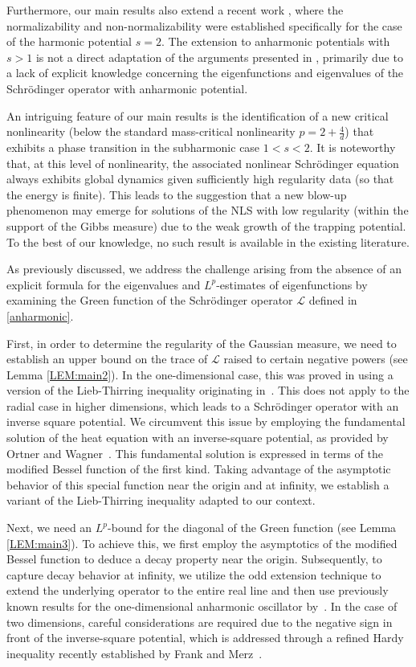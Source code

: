 \documentclass[%
11pt,  reqno]{amsart}
\theoremstyle{remarkstyle}
\newcommand{\1}{\hspace{0.2mm}\text{I}\hspace{0.2mm}}
\numberwithin{equation}{section}
\numberwithin{theorem}{section}
\begin{document}
	Furthermore, our main results also extend a recent work \cite{RSTW22}, where the normalizability and non-normalizability were established specifically for the case of the harmonic potential $s=2$. The extension to anharmonic potentials with $s>1$ is not a direct adaptation of the arguments presented in \cite{RSTW22}, primarily due to a lack of explicit knowledge concerning the eigenfunctions and eigenvalues of the Schr\"odinger operator with anharmonic potential.
	
	An intriguing feature of our main results is the identification of a new critical nonlinearity (below the standard mass-critical nonlinearity $p=2+\frac{4}{d}$) that exhibits a phase transition in the subharmonic case $1<s<2$. It is noteworthy that, at this level of nonlinearity, the associated nonlinear Schr\"odinger equation always exhibits global dynamics given sufficiently high regularity data (so that the energy is finite). This leads to the suggestion that a new blow-up phenomenon may emerge for solutions of the NLS with low regularity (within the support of the Gibbs measure) due to the weak growth of the trapping potential. To the best of our knowledge, no such result is available in the existing literature.
	
	As previously discussed, we address the challenge arising from the absence of an explicit formula for the eigenvalues and $L^p$-estimates of eigenfunctions by examining the Green function of the Schr\"odinger operator $\mathcal{L}$ defined in \eqref{anharmonic}. 
	
	First, in order to determine the regularity of the Gaussian measure, we need to establish an upper bound on the trace of $\mathcal{L}$ raised to certain negative powers (see Lemma \ref{LEM:main2}). In the one-dimensional case, this was proved in \cite[Example 3.2]{LNR18} using a version of the Lieb-Thirring inequality originating in~\cite{DFLP06}. This does not apply to the radial case in higher dimensions, which leads to a Schr\"odinger operator with an inverse square potential. We circumvent this issue by employing the fundamental solution of the heat equation with an inverse-square potential, as provided by Ortner and Wagner~\cite{OW18}. This fundamental solution is expressed in terms of the modified Bessel function of the first kind. Taking advantage of the asymptotic behavior of this special function near the origin and at infinity, we establish a variant of the Lieb-Thirring inequality adapted to our context.
	
	Next, we need an $L^p$-bound for the diagonal of the Green function (see Lemma \ref{LEM:main3}). To achieve this, we first employ the asymptotics of the modified Bessel function to deduce a decay property near the origin. Subsequently, to capture decay behavior at infinity, we utilize the odd extension technique to extend the underlying operator to the entire real line and then use previously known results for the one-dimensional anharmonic oscillator by~\cite{LNR18}. In the case of two dimensions, careful considerations are required due to the negative sign in front of the inverse-square potential, which is addressed through a refined Hardy inequality recently established by Frank and Merz~\cite{FM23}.
	
\end{document}
